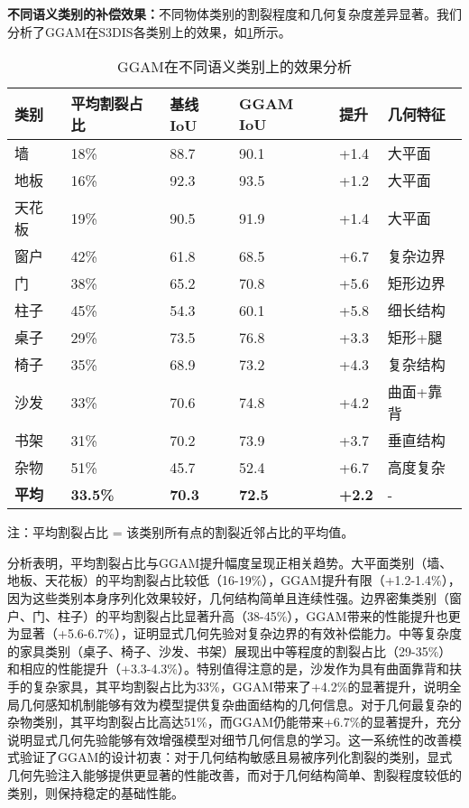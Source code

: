 \documentclass[preprint,12pt]{elsarticle}
\begin{document}
\textbf{不同语义类别的补偿效果：}不同物体类别的割裂程度和几何复杂度差异显著。我们分析了GGAM在S3DIS各类别上的效果，如\cref{tab:ggam_per_class}所示。

\begin{table}[htbp!]
	\centering
	\caption{GGAM在不同语义类别上的效果分析}
	\label{tab:ggam_per_class}
	\begin{tabular}{@{}llllll@{}}
		\toprule
		类别 & 平均割裂占比 & 基线IoU & GGAM IoU & 提升 & 几何特征 \\ 
		\midrule
		墙 & 18\% & 88.7 & 90.1 & +1.4 & 大平面 \\
		地板 & 16\% & 92.3 & 93.5 & +1.2 & 大平面 \\
		天花板 & 19\% & 90.5 & 91.9 & +1.4 & 大平面 \\
		\midrule
		窗户 & 42\% & 61.8 & 68.5 & +6.7 & 复杂边界 \\
		门 & 38\% & 65.2 & 70.8 & +5.6 & 矩形边界 \\
		柱子 & 45\% & 54.3 & 60.1 & +5.8 & 细长结构 \\
		\midrule
		桌子 & 29\% & 73.5 & 76.8 & +3.3 & 矩形+腿 \\
		椅子 & 35\% & 68.9 & 73.2 & +4.3 & 复杂结构 \\
		沙发 & 33\% & 70.6 & 74.8 & +4.2 & 曲面+靠背 \\
		书架 & 31\% & 70.2 & 73.9 & +3.7 & 垂直结构 \\
		杂物 & 51\% & 45.7 & 52.4 & +6.7 & 高度复杂 \\
		\midrule
		\textbf{平均} & \textbf{33.5\%} & \textbf{70.3} & \textbf{72.5} & \textbf{+2.2} & - \\
		\bottomrule
	\end{tabular}
\end{table}
注：平均割裂占比 = 该类别所有点的割裂近邻占比的平均值。

分析表明，平均割裂占比与GGAM提升幅度呈现正相关趋势。大平面类别（墙、地板、天花板）的平均割裂占比较低（16-19\%），GGAM提升有限（+1.2-1.4\%），因为这些类别本身序列化效果较好，几何结构简单且连续性强。边界密集类别（窗户、门、柱子）的平均割裂占比显著升高（38-45\%），GGAM带来的性能提升也更为显著（+5.6-6.7\%），证明显式几何先验对复杂边界的有效补偿能力。中等复杂度的家具类别（桌子、椅子、沙发、书架）展现出中等程度的割裂占比（29-35\%）和相应的性能提升（+3.3-4.3\%）。特别值得注意的是，沙发作为具有曲面靠背和扶手的复杂家具，其平均割裂占比为33\%，GGAM带来了+4.2\%的显著提升，说明全局几何感知机制能够有效为模型提供复杂曲面结构的几何信息。对于几何最复杂的杂物类别，其平均割裂占比高达51\%，而GGAM仍能带来+6.7\%的显著提升，充分说明显式几何先验能够有效增强模型对细节几何信息的学习。这一系统性的改善模式验证了GGAM的设计初衷：对于几何结构敏感且易被序列化割裂的类别，显式几何先验注入能够提供更显著的性能改善，而对于几何结构简单、割裂程度较低的类别，则保持稳定的基础性能。
\end{document}
